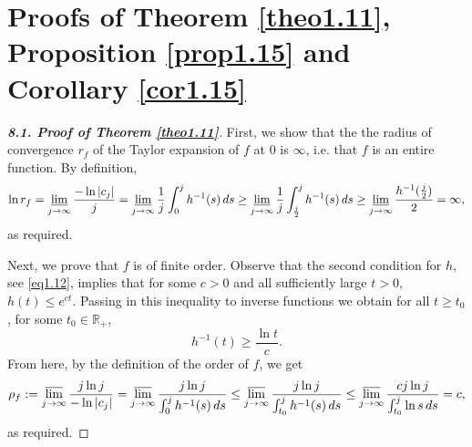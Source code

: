 \documentclass[11pt, oneside]{amsart}
\begin{document}
\section{Proofs of Theorem \ref{theo1.11}, Proposition \ref{prop1.15} and Corollary \ref{cor1.15}}
\begin{proof}[{\bf 8.1. Proof of Theorem \ref{theo1.11}}]
First, we show that the the radius of convergence $r_f$ of the Taylor expansion of $f$ at $0$ is $\infty$, i.e. that $f$ is an entire function. By definition,
\[
\ln r_f=\varliminf_{j\rightarrow\infty}\frac{-\ln |c_j|}{j}=\varliminf_{j\rightarrow\infty}\frac{1}{j}\int_0^j h^{-1}(s)\,ds\ge \varliminf_{j\rightarrow\infty}\frac{1}{j}\int_{\frac j2}^j h^{-1}(s)\,ds\ge \varliminf_{j\rightarrow\infty}\frac{h^{-1}(\frac j2)}{2}=\infty,
\]
as required.

Next, we prove that $f$ is of finite order. Observe that the second condition  for $h$, see \eqref{eq1.12}, implies that for some $c>0$ and all  sufficiently large $t>0$, $h(t)\le e^{ct}$.
Passing in this inequality to inverse functions we obtain for all 
  $t\ge t_0$, for some $t_0\in\mathbb R_+$,
\[
h^{-1}(t)\ge \frac{\ln t}{c}.
\]
From here, by the definition of the order of $f$, we get
\[
\rho_f:=\varlimsup_{j\rightarrow\infty}\frac{j\ln j}{-\ln |c_j|}=\varlimsup_{j\rightarrow\infty}\frac{j\ln j}{\int_0^j h^{-1}(s)\,ds}\le \varlimsup_{j\rightarrow\infty}\frac{j\ln j}{\int_{t_0}^j h^{-1}(s)\,ds}\le \varlimsup_{j\rightarrow\infty}\frac{c j\ln j}{\int_{t_0}^j \ln s\,ds}=c,
\]
as required.


\end{proof}
\end{document}
